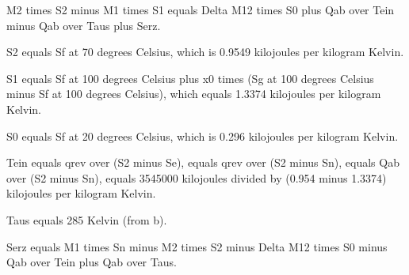 M2 times S2 minus M1 times S1 equals Delta M12 times S0 plus Qab over Tein minus Qab over Taus plus Serz.

S2 equals Sf at 70 degrees Celsius, which is 0.9549 kilojoules per kilogram Kelvin.

S1 equals Sf at 100 degrees Celsius plus x0 times (Sg at 100 degrees Celsius minus Sf at 100 degrees Celsius), which equals 1.3374 kilojoules per kilogram Kelvin.

S0 equals Sf at 20 degrees Celsius, which is 0.296 kilojoules per kilogram Kelvin.

Tein equals qrev over (S2 minus Se), equals qrev over (S2 minus Sn), equals Qab over (S2 minus Sn), equals 3545000 kilojoules divided by (0.954 minus 1.3374) kilojoules per kilogram Kelvin.

Taus equals 285 Kelvin (from b).

Serz equals M1 times Sn minus M2 times S2 minus Delta M12 times S0 minus Qab over Tein plus Qab over Taus.